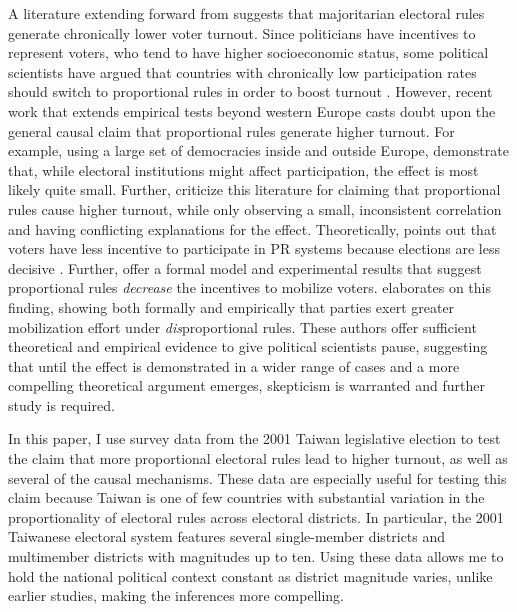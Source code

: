 \documentclass[12pt]{article}
\begin{document}
\doublespace
A literature extending forward from \cite{Powell1986} suggests that majoritarian electoral rules generate chronically lower voter turnout. Since politicians have incentives to represent voters, who tend to have higher socioeconomic status, some political scientists have argued that countries with chronically low participation rates should switch to proportional rules in order to boost turnout \citep{Lijphart1997, Lijphart1999}. However, recent work that extends empirical tests beyond western Europe casts doubt upon the general causal claim that proportional rules generate higher turnout. For example, using a large set of democracies inside and outside Europe, \cite{BlaisDobrzynska1998} demonstrate that, while electoral institutions might affect participation, the effect is most likely quite small. Further, \cite{BlaisAarts2006} criticize this literature for claiming that proportional rules cause higher turnout, while only observing a small, inconsistent correlation and having conflicting explanations for the effect. Theoretically, \cite{Jackman1987} points out that voters have less incentive to participate in PR systems because elections are less decisive \citep{Powell2000}. Further, \cite{SchramSonnemans1996} offer a formal model and experimental results that suggest proportional rules \textit{decrease} the incentives to mobilize voters. \cite{Rainey2011} elaborates on this finding, showing both formally and empirically that parties exert greater mobilization effort under \textit{dis}proportional rules. These authors offer sufficient theoretical and empirical evidence to give political scientists pause, suggesting that until the effect is demonstrated in a wider range of cases and a more compelling theoretical argument emerges, skepticism is warranted and further study is required.

In this paper, I use survey data from the 2001 Taiwan legislative election to test the claim that more proportional electoral rules lead to higher turnout, as well as several of the causal mechanisms. These data are especially useful for testing this claim because Taiwan is one of few countries with substantial variation in the proportionality of electoral rules across electoral districts. In particular, the 2001 Taiwanese electoral system features several single-member districts and multimember districts with magnitudes up to ten. Using these data allows me to hold the national political context constant as district magnitude varies, unlike earlier studies, making the inferences more compelling.
\end{document}
